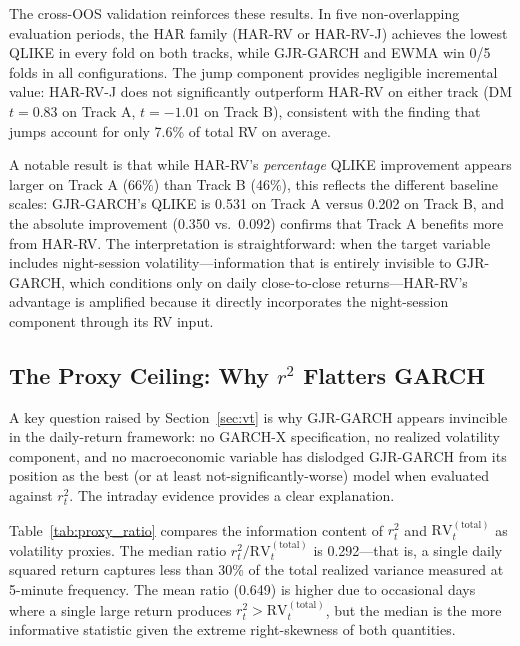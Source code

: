 The cross-OOS validation reinforces these results. In five non-overlapping evaluation periods, the HAR family (HAR-RV or HAR-RV-J) achieves the lowest QLIKE in every fold on both tracks, while GJR-GARCH and EWMA win 0/5 folds in all configurations. The jump component provides negligible incremental value: HAR-RV-J does not significantly outperform HAR-RV on either track (DM $t = 0.83$ on Track A, $t = -1.01$ on Track B), consistent with the finding that jumps account for only 7.6\% of total RV on average.

A notable result is that while HAR-RV's \textit{percentage} QLIKE improvement appears larger on Track A (66\%) than Track B (46\%), this reflects the different baseline scales: GJR-GARCH's QLIKE is 0.531 on Track A versus 0.202 on Track B, and the absolute improvement (0.350 vs.\ 0.092) confirms that Track A benefits more from HAR-RV. The interpretation is straightforward: when the target variable includes night-session volatility---information that is entirely invisible to GJR-GARCH, which conditions only on daily close-to-close returns---HAR-RV's advantage is amplified because it directly incorporates the night-session component through its RV input.


\subsection{The Proxy Ceiling: Why $r^2$ Flatters GARCH}
\label{sec:hf_proxy}

A key question raised by Section~\ref{sec:vt} is why GJR-GARCH appears invincible in the daily-return framework: no GARCH-X specification, no realized volatility component, and no macroeconomic variable has dislodged GJR-GARCH from its position as the best (or at least not-significantly-worse) model when evaluated against $r_t^2$. The intraday evidence provides a clear explanation.

Table~\ref{tab:proxy_ratio} compares the information content of $r_t^2$ and $\text{RV}^{(\text{total})}_t$ as volatility proxies. The median ratio $r_t^2 / \text{RV}_t^{(\text{total})}$ is 0.292---that is, a single daily squared return captures less than 30\% of the total realized variance measured at 5-minute frequency. The mean ratio (0.649) is higher due to occasional days where a single large return produces $r_t^2 > \text{RV}_t^{(\text{total})}$, but the median is the more informative statistic given the extreme right-skewness of both quantities.

